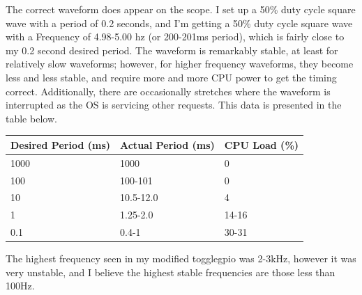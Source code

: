 \documentclass[letterpaper,10pt]{texMemo}
\begin{document}
\noindent The correct waveform does appear on the scope. I set up a 50\% duty
cycle square wave with a period of 0.2 seconds, and I'm getting a 50\% duty
cycle square wave with a Frequency of 4.98-5.00 hz (or 200-201ms period), which
is fairly close to my 0.2 second desired period. The waveform is remarkably
stable, at least for relatively slow waveforms; however, for higher frequency
waveforms, they become less and less stable, and require more and more CPU
power to get the timing correct. Additionally, there are occasionally stretches
where the waveform is interrupted as the OS is servicing other requests. This
data is presented in the table below. \\

\begin{center}
\begin{tabular}{| l | l | l |}
\hline
\textbf{Desired Period (ms)} & \textbf{Actual Period (ms)} & \textbf{CPU Load
(\%)}\\
\hline
1000 & 1000 & 0 \\
\hline
100 & 100-101  & 0 \\
\hline
10 & 10.5-12.0 & 4 \\ 
\hline
1 & 1.25-2.0 & 14-16 \\
\hline
0.1 & 0.4-1 & 30-31 \\
\hline
\end{tabular}
\end{center}

%
\noindent The highest frequency seen in my modified togglegpio was 2-3kHz,
however it was very unstable, and I believe the highest stable frequencies are
those less than 100Hz. \\


%
\end{document}
